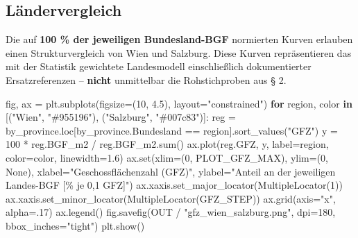 \documentclass[
  ngerman,
  a4paper,
  DIV=11]{scrreprt}
\newenvironment{Shaded}{\begin{snugshade}}{\end{snugshade}}
\newcommand{\BuiltInTok}[1]{\textcolor[rgb]{0.00,0.23,0.31}{#1}}
\newcommand{\ControlFlowTok}[1]{\textcolor[rgb]{0.00,0.23,0.31}{\textbf{#1}}}
\newcommand{\DecValTok}[1]{\textcolor[rgb]{0.68,0.00,0.00}{#1}}
\newcommand{\FloatTok}[1]{\textcolor[rgb]{0.68,0.00,0.00}{#1}}
\newcommand{\KeywordTok}[1]{\textcolor[rgb]{0.00,0.23,0.31}{\textbf{#1}}}
\newcommand{\NormalTok}[1]{\textcolor[rgb]{0.00,0.23,0.31}{#1}}
\newcommand{\OperatorTok}[1]{\textcolor[rgb]{0.37,0.37,0.37}{#1}}
\newcommand{\StringTok}[1]{\textcolor[rgb]{0.13,0.47,0.30}{#1}}
\newcommand{\VariableTok}[1]{\textcolor[rgb]{0.07,0.07,0.07}{#1}}
\begin{document}
\subsection{Ländervergleich}\label{luxe4ndervergleich}

Die auf \textbf{100 \% der jeweiligen Bundesland-BGF} normierten Kurven
erlauben einen Strukturvergleich von Wien und Salzburg. Diese Kurven
repräsentieren das mit der Statistik gewichtete Landesmodell
einschließlich dokumentierter Ersatzreferenzen -- \textbf{nicht}
unmittelbar die Rohstichproben aus § 2.

\begin{Shaded}
\begin{Highlighting}[]
\NormalTok{fig, ax }\OperatorTok{=}\NormalTok{ plt.subplots(figsize}\OperatorTok{=}\NormalTok{(}\DecValTok{10}\NormalTok{, }\FloatTok{4.5}\NormalTok{), layout}\OperatorTok{=}\StringTok{"constrained"}\NormalTok{)}
\ControlFlowTok{for}\NormalTok{ region, color }\KeywordTok{in}\NormalTok{ [(}\StringTok{"Wien"}\NormalTok{, }\StringTok{"\#955196"}\NormalTok{), (}\StringTok{"Salzburg"}\NormalTok{, }\StringTok{"\#007c83"}\NormalTok{)]:}
\NormalTok{    reg }\OperatorTok{=}\NormalTok{ by\_province.loc[by\_province.Bundesland }\OperatorTok{==}\NormalTok{ region].sort\_values(}\StringTok{"GFZ"}\NormalTok{)}
\NormalTok{    y }\OperatorTok{=} \DecValTok{100} \OperatorTok{*}\NormalTok{ reg.BGF\_m2 }\OperatorTok{/}\NormalTok{ reg.BGF\_m2.}\BuiltInTok{sum}\NormalTok{()}
\NormalTok{    ax.plot(reg.GFZ, y, label}\OperatorTok{=}\NormalTok{region, color}\OperatorTok{=}\NormalTok{color, linewidth}\OperatorTok{=}\FloatTok{1.6}\NormalTok{)}
\NormalTok{ax.}\BuiltInTok{set}\NormalTok{(xlim}\OperatorTok{=}\NormalTok{(}\DecValTok{0}\NormalTok{, PLOT\_GFZ\_MAX), ylim}\OperatorTok{=}\NormalTok{(}\DecValTok{0}\NormalTok{, }\VariableTok{None}\NormalTok{),}
\NormalTok{       xlabel}\OperatorTok{=}\StringTok{"Geschossflächenzahl (GFZ)"}\NormalTok{,}
\NormalTok{       ylabel}\OperatorTok{=}\StringTok{"Anteil an der jeweiligen Landes{-}BGF [\% je 0,1 GFZ]"}\NormalTok{)}
\NormalTok{ax.xaxis.set\_major\_locator(MultipleLocator(}\DecValTok{1}\NormalTok{))}
\NormalTok{ax.xaxis.set\_minor\_locator(MultipleLocator(GFZ\_STEP))}
\NormalTok{ax.grid(axis}\OperatorTok{=}\StringTok{"x"}\NormalTok{, alpha}\OperatorTok{=}\FloatTok{.17}\NormalTok{)}
\NormalTok{ax.legend()}
\NormalTok{fig.savefig(OUT }\OperatorTok{/} \StringTok{"gfz\_wien\_salzburg.png"}\NormalTok{, dpi}\OperatorTok{=}\DecValTok{180}\NormalTok{, bbox\_inches}\OperatorTok{=}\StringTok{"tight"}\NormalTok{)}
\NormalTok{plt.show()}
\end{Highlighting}
\end{Shaded}
\end{document}
